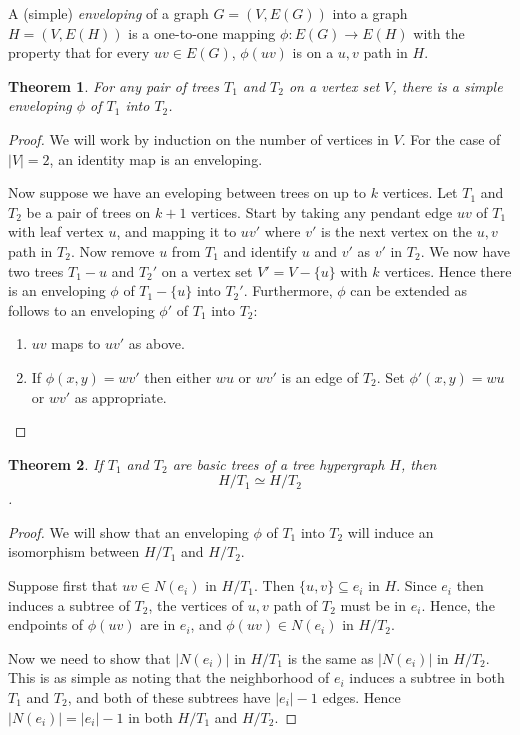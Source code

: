 \documentclass[12pt]{article}
\newtheorem{theorem}{Theorem}
\begin{document}
A (simple) {\it enveloping} of a graph $G = (V, E(G))$ into a graph $H = (V, E(H))$ is a one-to-one mapping $\phi: E(G) \rightarrow E(H)$ with the property that for every $uv \in E(G)$, $\phi(uv)$ is on a $u,v$ path in $H$.

\begin{theorem}
For any pair of trees $T_1$ and $T_2$ on a vertex set $V$, there is a simple enveloping $\phi$ of $T_1$ into $T_2$.
\end{theorem}

\begin{proof}
We will work by induction on the number of vertices in $V$.  For the case of $|V| = 2$, an identity map is an enveloping. 	

Now suppose we have an eveloping between trees on up to $k$ vertices.  Let $T_1$ and $T_2$ be a pair of trees on $k+1$ vertices.  Start by taking any pendant edge $uv$ of $T_1$ with leaf vertex $u$, and mapping it to $uv'$ where $v'$ is the next vertex on the $u,v$ path in $T_2$.  Now remove $u$ from $T_1$ and identify $u$ and $v'$ as $v'$ in $T_2$.  We now have two trees $T_1 - u$ and $T_2'$ on a vertex set $V' = V-\{u\}$ with $k$ vertices.  Hence there is an enveloping $\phi$ of $T_1-\{u\}$ into $T_2'$.  Furthermore, $\phi$ can be extended  as follows to an enveloping $\phi '$ of $T_1$ into $T_2$:
\begin{enumerate}
	\item $uv$ maps to $uv'$ as above. 
	\item If $\phi(x,y)  = wv'$ then either $wu$ or $wv'$ is an edge of $T_2$.  Set $\phi'(x,y) = wu$ or $wv'$ as appropriate.
\end{enumerate} 
\end{proof}

\begin{theorem}
	If $T_1$ and $T_2$ are basic trees of a tree hypergraph $H$, then \[H/T_1 \simeq H/T_2\].
\end{theorem}

\begin{proof}
	We will show that an enveloping $\phi$ of $T_1$ into $T_2$ will induce an isomorphism between $H/T_1$ and $H/T_2$.

Suppose first that $uv \in N(e_i)$ in $H/T_1$.  Then $\{u,v\}\subseteq e_i$ in $H$.  Since $e_i$ then induces a subtree of $T_2$, the vertices of $u,v$ path of $T_2$ must be in $e_i$.  Hence, the endpoints of $\phi(uv)$ are in $e_i$, and $\phi(uv) \in N(e_i)$ in $H/T_2$.

Now we need to show that $|N(e_i)|$ in $H/T_1$ is the same as  $|N(e_i)|$ in $H/T_2$.  This is as simple as noting that the neighborhood of $e_i$ induces a subtree in both $T_1$ and $T_2$, and both of these subtrees have $|e_i|-1$ edges.  Hence $|N(e_i)| = |e_i|-1$ in both $H/T_1$ and $H/T_2$.
\end{proof}
\end{document}
